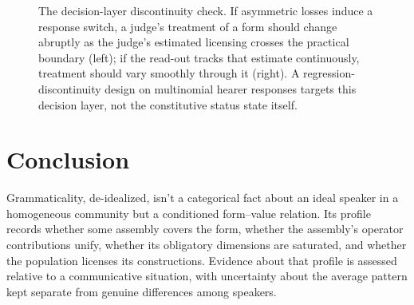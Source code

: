\documentclass[12pt,letterpaper]{article}
\begin{document}
\begin{figure}[t]
\centering
{}
\caption{The decision-layer discontinuity check. If asymmetric losses induce a
response switch, a judge's treatment of a form should change abruptly as the
judge's estimated licensing crosses the practical boundary (left); if the
read-out tracks that estimate continuously, treatment should vary smoothly
through it (right). A regression-discontinuity design on multinomial hearer
responses targets this decision layer, not the constitutive status state itself.}
\label{fig:rd-test}
\end{figure}

\section{Conclusion}

Grammaticality, de-idealized, isn't a categorical fact about an ideal speaker
in a homogeneous community but a conditioned form--value relation. Its profile
records whether some assembly covers the form, whether the assembly's operator
contributions unify, whether its obligatory dimensions are saturated, and
whether the population licenses its constructions. Evidence about that profile
is assessed relative to a communicative situation, with uncertainty about the
average pattern kept separate from genuine differences among speakers.
\end{document}
